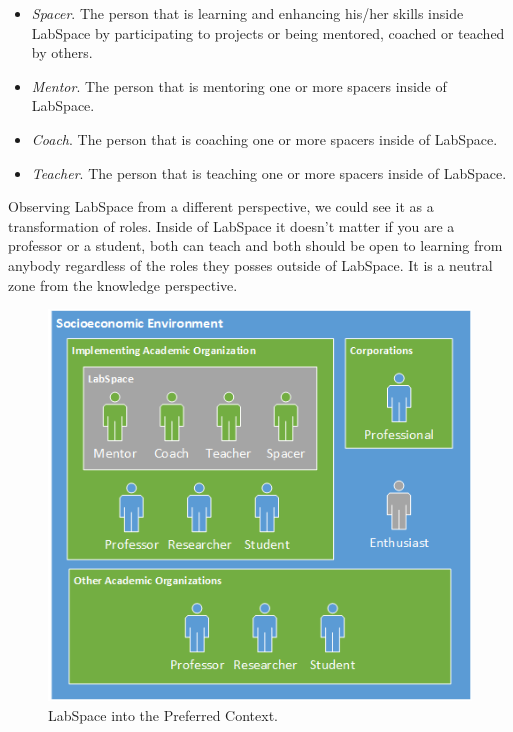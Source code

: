 \documentclass[a4paper, 11pt]{article}
\begin{document}
\begin{itemize}[noitemsep]
    \item \textit{Spacer}. The person that is learning and enhancing his/her skills inside LabSpace by participating to projects or being mentored, coached or teached by others.
    \item \textit{Mentor}. The person that is mentoring one or more spacers inside of LabSpace.
    \item \textit{Coach}. The person that is coaching one or more spacers inside of LabSpace.
    \item \textit{Teacher}. The person that is teaching one or more spacers inside of LabSpace.
\end{itemize}

Observing LabSpace from a different perspective, we could see it as a transformation of roles. Inside of LabSpace it doesn't matter if you are a professor or a student, both can teach and both should be open to learning from anybody regardless of the roles they posses outside of LabSpace. It is a neutral zone from the knowledge perspective.

\begin{figure}[h!]
  \begin{center}
    \includegraphics[width=\textwidth,height=\textheight,keepaspectratio]{imagery/ls_context.png}
    \caption{LabSpace into the Preferred Context.}
    \label{fig:ls_env}
  \end{center}
\end{figure}
\end{document}
